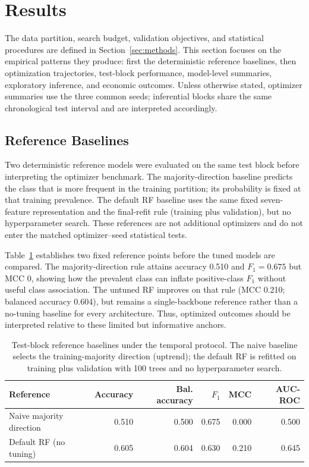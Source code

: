 \section{Results}\label{sec:results}

The data partition, search budget, validation objectives, and statistical procedures are defined in Section~\ref{sec:methods}. This section focuses on the empirical patterns they produce: first the deterministic reference baselines, then optimization trajectories, test-block performance, model-level summaries, exploratory inference, and economic outcomes. Unless otherwise stated, optimizer summaries use the three common seeds; inferential blocks share the same chronological test interval and are interpreted accordingly.

\subsection{Reference Baselines}

Two deterministic reference models were evaluated on the same test block before interpreting the optimizer benchmark. The majority-direction baseline predicts the class that is more frequent in the training partition; its probability is fixed at that training prevalence. The default RF baseline uses the same fixed seven-feature representation and the final-refit rule (training plus validation), but no hyperparameter search. These references are not additional optimizers and do not enter the matched optimizer--seed statistical tests.

Table~\ref{tab:reference_baselines} establishes two fixed reference points before the tuned models are compared. The majority-direction rule attains accuracy 0.510 and $F_1=0.675$ but MCC 0, showing how the prevalent class can inflate positive-class $F_1$ without useful class association. The untuned RF improves on that rule (MCC 0.210; balanced accuracy 0.604), but remains a single-backbone reference rather than a no-tuning baseline for every architecture. Thus, optimized outcomes should be interpreted relative to these limited but informative anchors.

\begin{table}[htbp]
\centering
\caption{Test-block reference baselines under the temporal protocol. The naive baseline selects the training-majority direction (uptrend); the default RF is refitted on training plus validation with 100 trees and no hyperparameter search.}
\label{tab:reference_baselines}
\manuscripttablestyle
\begin{tabular}{lrrrrr}\toprule
\textbf{Reference} & \textbf{Accuracy} & \textbf{Bal. accuracy} & \textbf{$F_1$} & \textbf{MCC} & \textbf{AUC-ROC}\\\midrule
Naive majority direction & 0.510 & 0.500 & 0.675 & 0.000 & 0.500\\
Default RF (no tuning) & 0.605 & 0.604 & 0.630 & 0.210 & 0.645\\\bottomrule
\end{tabular}
\end{table}

